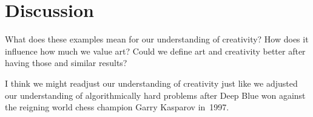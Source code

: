 
\section{Discussion}
\label{sec:discussion}

What does these examples mean for our understanding of creativity? How does it
influence how much we value art? Could we define art and creativity better
after having those and similar results?

I think we might readjust our understanding of creativity just like we adjusted
our understanding of algorithmically hard problems after Deep Blue won against
the reigning world chess champion Garry Kasparov in~1997.
